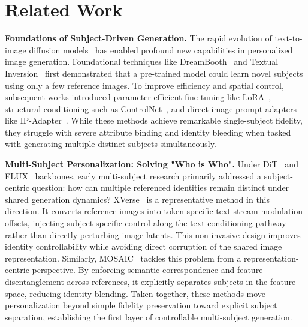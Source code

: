 \section{Related Work}

\textbf{Foundations of Subject-Driven Generation.} 
The rapid evolution of text-to-image diffusion models~\cite{rombach2022high} has enabled profound new capabilities in personalized image generation. Foundational techniques like DreamBooth~\cite{ruiz2023dreambooth} and Textual Inversion~\cite{gal2022image} first demonstrated that a pre-trained model could learn novel subjects using only a few reference images. To improve efficiency and spatial control, subsequent works introduced parameter-efficient fine-tuning like LoRA~\cite{hu2021lora}, structural conditioning such as ControlNet~\cite{zhang2023adding}, and direct image-prompt adapters like IP-Adapter~\cite{ye2023ip}. While these methods achieve remarkable single-subject fidelity, they struggle with severe attribute binding and identity bleeding when tasked with generating multiple distinct subjects simultaneously.

\textbf{Multi-Subject Personalization: Solving "Who is Who".} 
Under DiT~\cite{peebles2023scalable} and FLUX~\cite{flux2024} backbones, early multi-subject research primarily addressed a subject-centric question: how can multiple referenced identities remain distinct under shared generation dynamics? XVerse~\cite{xverse2024} is a representative method in this direction. It converts reference images into token-specific text-stream modulation offsets, injecting subject-specific control along the text-conditioning pathway rather than directly perturbing image latents. This non-invasive design improves identity controllability while avoiding direct corruption of the shared image representation. Similarly, MOSAIC~\cite{mosaic2024} tackles this problem from a representation-centric perspective. By enforcing semantic correspondence and feature disentanglement across references, it explicitly separates subjects in the feature space, reducing identity blending. Taken together, these methods move personalization beyond simple fidelity preservation toward explicit subject separation, establishing the first layer of controllable multi-subject generation.

